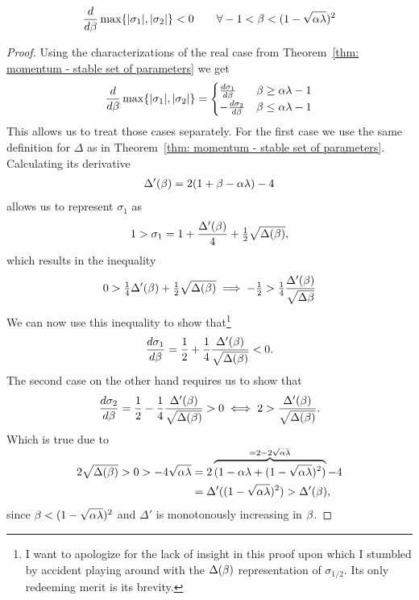\begin{lemma}\label{lem-appdx: just at the border of complex case is best beta}
	\begin{align*}
		\frac{d}{d\beta}\max\{|\sigma_1|,|\sigma_2|\} < 0 \qquad
		\forall -1<\beta <(1-\sqrt{\alpha\lambda})^2
	\end{align*}
\end{lemma}
\begin{proof}
	Using the characterizations of the real case
	from Theorem~\ref{thm: momentum - stable set of parameters} we get
	\begin{align*}
		\frac{d}{d\beta}\max\{|\sigma_1|,|\sigma_2|\}
		= \begin{cases}
			\frac{d\sigma_1}{d\beta} & \beta \ge \alpha\lambda -1 \\
			-\frac{d\sigma_2}{d\beta} & \beta \le \alpha\lambda -1 
		\end{cases}
	\end{align*}
	This allows us to treat those cases separately. For the first case we use
	the same definition for \(\Delta\) as in Theorem~\ref{thm: momentum - stable
	set of parameters}. Calculating its derivative
	\begin{align*}
		\Delta'(\beta) = 2(1+\beta-\alpha\lambda)	-4
	\end{align*}
	allows us to represent \(\sigma_1\) as
	\begin{align*}
		1>\sigma_1
		= 1 + \frac{\Delta'(\beta)}{4} + \tfrac12 \sqrt{\Delta(\beta)},
	\end{align*}
	which results in the inequality
	\begin{align*}
		0 > \tfrac14\Delta'(\beta) + \tfrac12\sqrt{\Delta(\beta)}
		\implies -\tfrac12 > \tfrac14\frac{\Delta'(\beta)}{\sqrt{\Delta{\beta}}}
	\end{align*}
	We can now use this inequality to show that\footnote{
		I want to apologize for the lack of insight in this proof upon which I
		stumbled by accident playing around with the \(\Delta(\beta)\)
		representation of \(\sigma_{1/2}\). Its only redeeming merit is its brevity.
	}
	\begin{align*}
		\frac{d\sigma_1}{d\beta}
		= \frac12 + \frac14 \frac{\Delta'(\beta)}{\sqrt{\Delta(\beta)}} < 0.
	\end{align*}
	The second case on the other hand requires us to show that
	\begin{align*}
		\frac{d\sigma_2}{d\beta}
		= \frac12 - \frac14 \frac{\Delta'(\beta)}{\sqrt{\Delta(\beta)}} > 0
		\iff 2 > \frac{\Delta'(\beta)}{\sqrt{\Delta(\beta)}}.
	\end{align*}
	Which is true due to
	\begin{align*}
		2\sqrt{\Delta(\beta)} > 0 > -4\sqrt{\alpha\lambda}
		&= 2\overbrace{
			(1-\alpha\lambda + (1-\sqrt{\alpha\lambda})^2)
		}^{\smash{=2-2\sqrt{\alpha\lambda}}} -4\\
		&= \Delta'((1-\sqrt{\alpha\lambda})^2) > \Delta'(\beta),
	\end{align*}
	since \(\beta<(1-\sqrt{\alpha\lambda})^2\) and \(\Delta'\) is monotonously
	increasing in \(\beta\).
\end{proof}

